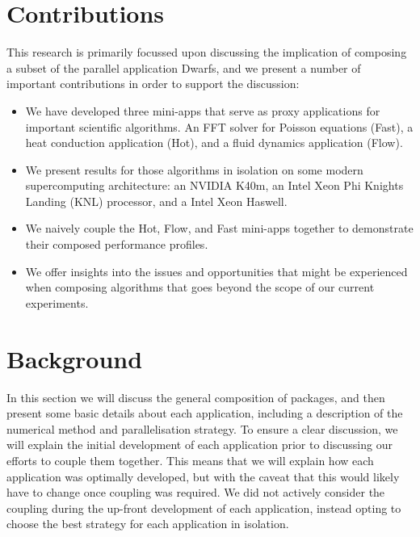 \documentclass[runningheads,a4paper]{llncs}
\begin{document}
\section{Contributions}

This research is primarily focussed upon discussing the implication of composing a subset of the parallel application Dwarfs, and we present a number of important contributions in order to support the discussion:

\begin{itemize}
  \item We have developed three mini-apps that serve as proxy applications for important scientific algorithms. An FFT solver for Poisson equations (Fast), a heat conduction application (Hot), and a fluid dynamics application (Flow).

  \item We present results for those algorithms in isolation on some modern supercomputing architecture: an NVIDIA K40m, an Intel Xeon Phi Knights Landing (KNL) processor, and a Intel Xeon Haswell.

  \item We naively couple the Hot, Flow, and Fast mini-apps together to demonstrate their composed performance profiles.

  \item We offer insights into the issues and opportunities that might be experienced when composing algorithms that goes beyond the scope of our current experiments.

\end{itemize}

\section{Background}

In this section we will discuss the general composition of packages, and then present some basic details about each application, including a description of the numerical method and parallelisation strategy. To ensure a clear discussion, we will explain the initial development of each application prior to discussing our efforts to couple them together. This means that we will explain how each application was optimally developed, but with the caveat that this would likely have to change once coupling was required. We did not actively consider the coupling during the up-front development of each application, instead opting to choose the best strategy for each application in isolation.
\end{document}
